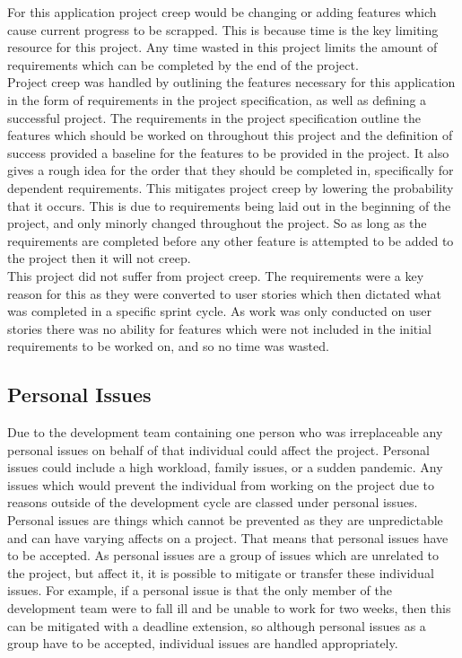 \documentclass{article}
\begin{document}
For this application project creep would be changing or adding features which cause current progress to be scrapped. This is because time is the key limiting resource for this project. Any time wasted in this project limits the amount of requirements which can be completed by the end of the project. \\

Project creep was handled by outlining the features necessary for this application in the form of requirements in the project specification, as well as defining a successful project. The requirements in the project specification outline the features which should be worked on throughout this project and the definition of success provided a baseline for the features to be provided in the project. It also gives a rough idea for the order that they should be completed in, specifically for dependent requirements. This mitigates project creep by lowering the probability that it occurs. This is due to requirements being laid out in the beginning of the project, and only minorly changed throughout the project. So as long as the requirements are completed before any other feature is attempted to be added to the project then it will not creep. \\

This project did not suffer from project creep. The requirements were a key reason for this as they were converted to user stories which then dictated what was completed in a specific sprint cycle. As work was only conducted on user stories there was no ability for features which were not included in the initial requirements to be worked on, and so no time was wasted. \\

\subsection{Personal Issues}

Due to the development team containing one person who was irreplaceable any personal issues on behalf of that individual could affect the project. Personal issues could include a high workload, family issues, or a sudden pandemic. Any issues which would prevent the individual from working on the project due to reasons outside of the development cycle are classed under personal issues. \\

Personal issues are things which cannot be prevented as they are unpredictable and can have varying affects on a project. That means that personal issues have to be accepted. As personal issues are a group of issues which are unrelated to the project, but affect it, it is possible to mitigate or transfer these individual issues. For example, if a personal issue is that the only member of the development team were to fall ill and be unable to work for two weeks, then this can be mitigated with a deadline extension, so although personal issues as a group have to be accepted, individual issues are handled appropriately. \\
\end{document}

